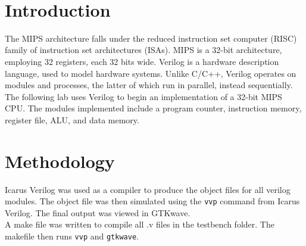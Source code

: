 \documentclass[twocolumn]{article}
\newcommand{\cc}[1]{\texttt{#1}}
\begin{document}
\

{\newpage}

\maketitle        


\section{Introduction}

The MIPS architecture falls under the reduced instruction set computer (RISC) family of instruction set architectures (ISAs). MIPS is a 32-bit architecture, employing 32 registers, each 32 bits wide. Verilog is a hardware description language, used to model hardware systems. Unlike C/C++, Verilog operates on modules and processes, the latter of which run in parallel, instead sequentially. \\  

The following lab uses Verilog to begin an implementation of a 32-bit MIPS CPU. The modules implemented include a program counter, instruction memory, register file, ALU, and data memory. 

\section{Methodology}

Icarus Verilog was used as a compiler to produce the object files for all verilog modules. The object file was then simulated using the \cc{vvp} command from Icarus Verilog. The final output was viewed in GTKwave. \\

A make file was written to compile all .v files in the testbench folder. The makefile then runs \cc{vvp} and \cc{gtkwave}. 
\end{document}
